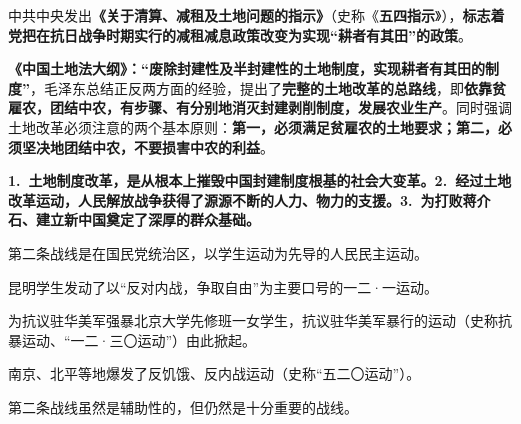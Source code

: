 {中共中央发出\textbf{{《关于清算、减租及土地问题的指示》}}（史称《\textbf{{五四指示}}》），\textbf{{标志着党把在抗日战争时期实行的减租减息政策改变为实现}{``}{耕者有其田}{''}{的政策}}。}

{\textbf{{《中国土地法大纲》：}{``}{废除封建性及半封建性的土地制度，实现耕者有其田的制度}{''}}，毛泽东总结正反两方面的经验，提出了\textbf{{完整的土地改革的总路线}}，即\textbf{{依靠贫雇农，团结中农，有步骤、有分别地消灭封建剥削制度，发展农业生产}}。同时强调土地改革必须注意的两个基本原则：\textbf{{第一，必须满足贫雇农的土地要求；第二，必须坚决地团结中农，不要损害中农的利益}}。}

{\textbf{{1.~}{土地制度改革，是从根本上摧毁中国封建制度根基的社会大变革。}{2.~}{经过土地改革运动，人民解放战争获得了源源不断的人力、物力的支援。3.~}{为打败蒋介石、建立新中国奠定了深厚的群众基础。}}}

{{第二条战线是在国民党统治区，以学生运动为先导的人民民主运动}。}

{昆明学生发动了以``反对内战，争取自由''为主要口号的一二·一运动。}

{为抗议驻华美军强暴北京大学先修班一女学生，抗议驻华美军暴行的运动（史称{抗暴运动}、``{一二·三〇运动}''）由此掀起。}

{南京、北平等地爆发了反饥饿、反内战运动（史称``{五二〇运动}''）。}

{第二条战线虽然是辅助性的，但仍然是十分重要的战线。}
